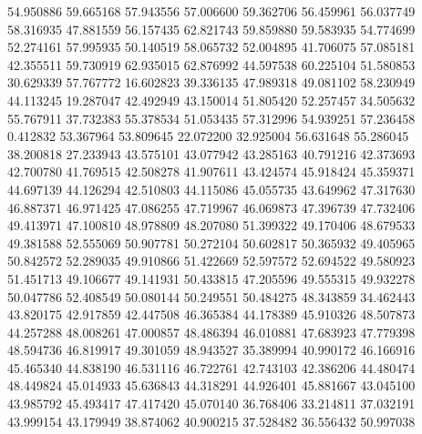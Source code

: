 54.950886
59.665168
57.943556
57.006600
59.362706
56.459961
56.037749
58.316935
47.881559
56.157435
62.821743
59.859880
59.583935
54.774699
52.274161
57.995935
50.140519
58.065732
52.004895
41.706075
57.085181
42.355511
59.730919
62.935015
62.876992
44.597538
60.225104
51.580853
30.629339
57.767772
16.602823
39.336135
47.989318
49.081102
58.230949
44.113245
19.287047
42.492949
43.150014
51.805420
52.257457
34.505632
55.767911
37.732383
55.378534
51.053435
57.312996
54.939251
57.236458
0.412832
53.367964
53.809645
22.072200
32.925004
56.631648
55.286045
38.200818
27.233943
43.575101
43.077942
43.285163
40.791216
42.373693
42.700780
41.769515
42.508278
41.907611
43.424574
45.918424
45.359371
44.697139
44.126294
42.510803
44.115086
45.055735
43.649962
47.317630
46.887371
46.971425
47.086255
47.719967
46.069873
47.396739
47.732406
49.413971
47.100810
48.978809
48.207080
51.399322
49.170406
48.679533
49.381588
52.555069
50.907781
50.272104
50.602817
50.365932
49.405965
50.842572
52.289035
49.910866
51.422669
52.597572
52.694522
49.580923
51.451713
49.106677
49.141931
50.433815
47.205596
49.555315
49.932278
50.047786
52.408549
50.080144
50.249551
50.484275
48.343859
34.462443
43.820175
42.917859
42.447508
46.365384
44.178389
45.910326
48.507873
44.257288
48.008261
47.000857
48.486394
46.010881
47.683923
47.779398
48.594736
46.819917
49.301059
48.943527
35.389994
40.990172
46.166916
45.465340
44.838190
46.531116
46.722761
42.743103
42.386206
44.480474
48.449824
45.014933
45.636843
44.318291
44.926401
45.881667
43.045100
43.985792
45.493417
47.417420
45.070140
36.768406
33.214811
37.032191
43.999154
43.179949
38.874062
40.900215
37.528482
36.556432
50.997038
